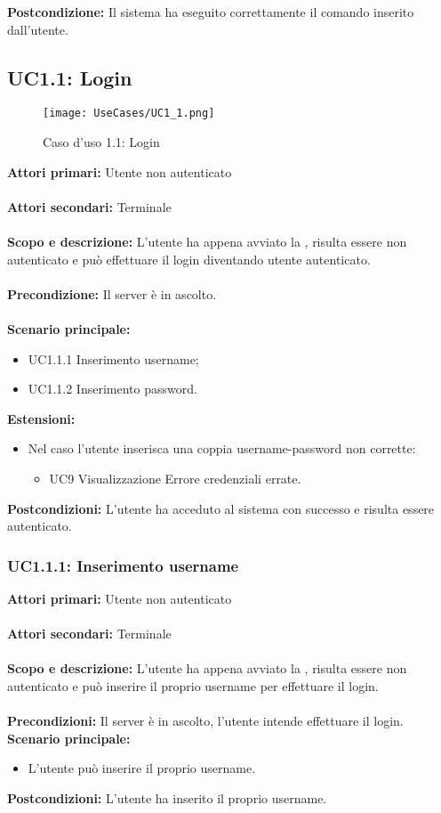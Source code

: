 \documentclass{scalatekids-article}
\begin{document}
\textbf{Postcondizione:} Il sistema ha eseguito correttamente il comando inserito dall'utente.


\subsection{UC1.1: Login}

\begin{figure}[H]
  \begin{center}
    \texttt{[image: UseCases/UC1\_1.png]}
    \caption*{Caso d'uso 1.1: Login}
  \end{center}
\end{figure}
\textbf{Attori primari:} Utente non autenticato\\ \\
\textbf{Attori secondari:} Terminale\\ \\
\textbf{Scopo e descrizione:}
L’utente ha appena avviato la , risulta essere non autenticato e può effettuare il login diventando utente
autenticato.\\ \\
\textbf{Precondizione:} Il server è in ascolto.\\ \\
\textbf{Scenario principale:}
\begin{itemize}
\item UC1.1.1 Inserimento username;
\item UC1.1.2 Inserimento password.
\end{itemize}
\textbf{Estensioni:}
\begin{itemize}
\item Nel caso l'utente inserisca una coppia username-password non corrette:
  \begin{itemize}
  \item UC9 Visualizzazione Errore credenziali errate.
  \end{itemize}
\end{itemize}
\textbf{Postcondizioni:} L'utente ha acceduto al sistema con successo e risulta essere autenticato.

\subsubsection{UC1.1.1: Inserimento username}

\textbf{Attori primari:} Utente non autenticato\\ \\
\textbf{Attori secondari:} Terminale\\ \\
\textbf{Scopo e descrizione:}
L'utente ha appena avviato la , risulta essere non autenticato e può inserire il proprio username per effettuare il login.\\ \\
\textbf{Precondizioni:} Il server è in ascolto, l'utente intende effettuare il login.
\textbf{Scenario principale:}
\begin{itemize}
\item L'utente può inserire il proprio username.
\end{itemize}
\textbf{Postcondizioni:} L'utente ha inserito il proprio username.
\end{document}
